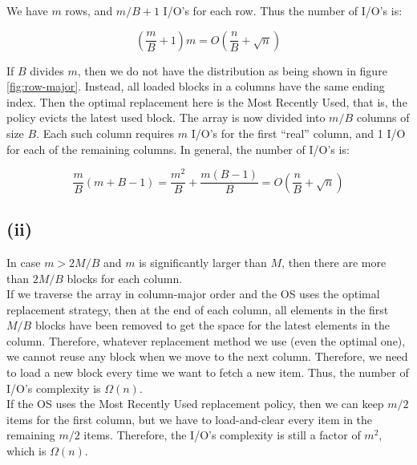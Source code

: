 We have $m$ rows, and $m/B + 1$ I/O's for each row. Thus the number of I/O's is:

 $$(\frac{m}{B} + 1)m = O(\frac{n}{B} + \sqrt{n})$$

If $B$ divides $m$, then we do not have the distribution as being shown in figure \ref{fig:row-major}. Instead, all loaded blocks in a columns have the same ending index. Then the optimal replacement here is the Most Recently Used, that is, the policy evicts the latest used block. The array is now divided into $m / B$ columns of size $B$. Each such column requires $m$ I/O's for the first ``real'' column, and 1 I/O for each of the remaining columns. In general, the number of I/O's is:

$$\frac{m}{B}(m + B - 1) = \frac{m^2}{B} + \frac{m(B - 1)}{B} = O(\frac{n}{B} + \sqrt{n})$$

\subsection*{(ii)}
In case $m > 2M/B$ and $m$ is significantly larger than $M$, then there are more than $2M/B$ blocks for each column.\\

If we traverse the array in column-major order and the OS uses the optimal replacement strategy, then at the end of each column, all elements in the first $M/B $ blocks have been removed to get the space for the latest elements in the column. Therefore, whatever replacement method we use (even the optimal one), we cannot reuse any block when we move to the next column. Therefore, we need to load a new block every time we want to fetch a new item. Thus, the number of I/O's complexity is $\Omega(n)$.\\

If the OS uses the Most Recently Used replacement policy, then we can keep $m/2$ items for the first column, but we have to load-and-clear every item in the remaining $m/2$ items. Therefore, the I/O's complexity is still a factor of $m^2$, which is $\Omega(n)$.
